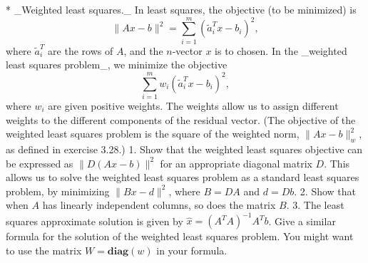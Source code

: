 * _Weighted least squares._ In least squares, the objective (to be minimized) is \[\|Ax-b\|^{2}=\sum_{i=1}^{m}(\tilde{a}_{i}^{T}x-b_{i})^{2},\] where \(\tilde{a}_{i}^{T}\) are the rows of \(A\), and the \(n\)-vector \(x\) is to chosen. In the _weighted least squares problem_, we minimize the objective \[\sum_{i=1}^{m}w_{i}(\tilde{a}_{i}^{T}x-b_{i})^{2},\] where \(w_{i}\) are given positive weights. The weights allow us to assign different weights to the different components of the residual vector. (The objective of the weighted least squares problem is the square of the weighted norm, \(\|Ax-b\|_{w}^{2}\), as defined in exercise 3.28.) 1. Show that the weighted least squares objective can be expressed as \(\|D(Ax-b)\|^{2}\) for an appropriate diagonal matrix \(D\). This allows us to solve the weighted least squares problem as a standard least squares problem, by minimizing \(\|Bx-d\|^{2}\), where \(B=DA\) and \(d=Db\). 2. Show that when \(A\) has linearly independent columns, so does the matrix \(B\). 3. The least squares approximate solution is given by \(\hat{x}=(A^{T}A)^{-1}A^{T}b\). Give a similar formula for the solution of the weighted least squares problem. You might want to use the matrix \(W=\mathbf{diag}(w)\) in your formula.


